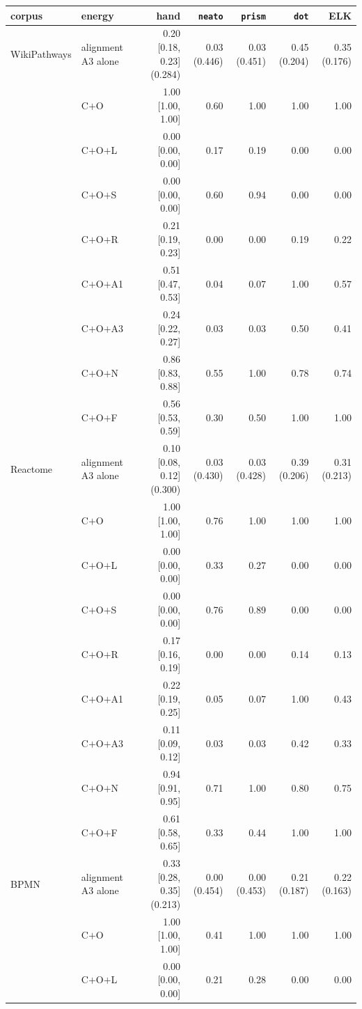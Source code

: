\documentclass[11pt]{article}
\begin{document}
\begin{center}\scriptsize\setlength{\tabcolsep}{3.5pt}
\begin{tabular}{llrrrrr}
\toprule
corpus & energy & hand & \texttt{neato} & \texttt{prism} & \texttt{dot} & ELK \\
\midrule
WikiPathways & alignment A3 alone & 0.20 [0.18, 0.23] (0.284) & 0.03 (0.446) & 0.03 (0.451) & 0.45 (0.204) & 0.35 (0.176) \\
& C$+$O & 1.00 [1.00, 1.00] & 0.60 & 1.00 & 1.00 & 1.00 \\
& C$+$O$+$L & 0.00 [0.00, 0.00] & 0.17 & 0.19 & 0.00 & 0.00 \\
& C$+$O$+$S & 0.00 [0.00, 0.00] & 0.60 & 0.94 & 0.00 & 0.00 \\
& C$+$O$+$R & 0.21 [0.19, 0.23] & 0.00 & 0.00 & 0.19 & 0.22 \\
& C$+$O$+$A1 & 0.51 [0.47, 0.53] & 0.04 & 0.07 & 1.00 & 0.57 \\
& C$+$O$+$A3 & 0.24 [0.22, 0.27] & 0.03 & 0.03 & 0.50 & 0.41 \\
& C$+$O$+$N & 0.86 [0.83, 0.88] & 0.55 & 1.00 & 0.78 & 0.74 \\
& C$+$O$+$F & 0.56 [0.53, 0.59] & 0.30 & 0.50 & 1.00 & 1.00 \\
\midrule
Reactome & alignment A3 alone & 0.10 [0.08, 0.12] (0.300) & 0.03 (0.430) & 0.03 (0.428) & 0.39 (0.206) & 0.31 (0.213) \\
& C$+$O & 1.00 [1.00, 1.00] & 0.76 & 1.00 & 1.00 & 1.00 \\
& C$+$O$+$L & 0.00 [0.00, 0.00] & 0.33 & 0.27 & 0.00 & 0.00 \\
& C$+$O$+$S & 0.00 [0.00, 0.00] & 0.76 & 0.89 & 0.00 & 0.00 \\
& C$+$O$+$R & 0.17 [0.16, 0.19] & 0.00 & 0.00 & 0.14 & 0.13 \\
& C$+$O$+$A1 & 0.22 [0.19, 0.25] & 0.05 & 0.07 & 1.00 & 0.43 \\
& C$+$O$+$A3 & 0.11 [0.09, 0.12] & 0.03 & 0.03 & 0.42 & 0.33 \\
& C$+$O$+$N & 0.94 [0.91, 0.95] & 0.71 & 1.00 & 0.80 & 0.75 \\
& C$+$O$+$F & 0.61 [0.58, 0.65] & 0.33 & 0.44 & 1.00 & 1.00 \\
\midrule
BPMN & alignment A3 alone & 0.33 [0.28, 0.35] (0.213) & 0.00 (0.454) & 0.00 (0.453) & 0.21 (0.187) & 0.22 (0.163) \\
& C$+$O & 1.00 [1.00, 1.00] & 0.41 & 1.00 & 1.00 & 1.00 \\
& C$+$O$+$L & 0.00 [0.00, 0.00] & 0.21 & 0.28 & 0.00 & 0.00 \\

\end{tabular}
\end{center}
\end{document}
